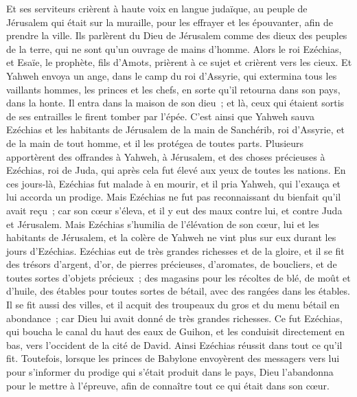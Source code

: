 \begin{multicols}{2}
Et ses serviteurs crièrent à haute voix en langue judaïque, au peuple de Jérusalem qui était sur la muraille, pour les effrayer et les épouvanter, afin de prendre la ville.
Ils parlèrent du Dieu de Jérusalem comme des dieux des peuples de la terre, qui ne sont qu'un ouvrage de mains d'homme.
Alors le roi Ezéchias, et Esaïe, le prophète, fils d'Amots, prièrent à ce sujet et crièrent vers les cieux.
Et Yahweh envoya un ange, dans le camp du roi d'Assyrie, qui extermina tous les vaillants hommes, les princes et les chefs, en sorte qu'il retourna dans son pays, dans la honte. Il entra dans la maison de son dieu~; et là, ceux qui étaient sortis de ses entrailles le firent tomber par l'épée.
C'est ainsi que Yahweh sauva Ezéchias et les habitants de Jérusalem de la main de Sanchérib, roi d'Assyrie, et de la main de tout homme, et il les protégea de toutes parts.
Plusieurs apportèrent des offrandes à Yahweh, à Jérusalem, et des choses précieuses à Ezéchias, roi de Juda, qui après cela fut élevé aux yeux de toutes les nations.
En ces jours-là, Ezéchias fut malade à en mourir, et il pria Yahweh, qui l'exauça et lui accorda un prodige.
Mais Ezéchias ne fut pas reconnaissant du bienfait qu'il avait reçu~; car son cœur s'éleva, et il y eut des maux contre lui, et contre Juda et Jérusalem.
Mais Ezéchias s'humilia de l'élévation de son cœur, lui et les habitants de Jérusalem, et la colère de Yahweh ne vint plus sur eux durant les jours d'Ezéchias.
Ezéchias eut de très grandes richesses et de la gloire, et il se fit des trésors d'argent, d'or, de pierres précieuses, d'aromates, de boucliers, et de toutes sortes d'objets précieux~;
des magasins pour les récoltes de blé, de moût et d'huile, des étables pour toutes sortes de bétail, avec des rangées dans les étables.
Il se fit aussi des villes, et il acquit des troupeaux du gros et du menu bétail en abondance~; car Dieu lui avait donné de très grandes richesses.
Ce fut Ezéchias, qui boucha le canal du haut des eaux de Guihon, et les conduisit directement en bas, vers l'occident de la cité de David. Ainsi Ezéchias réussit dans tout ce qu'il fit.
Toutefois, lorsque les princes de Babylone envoyèrent des messagers vers lui pour s'informer du prodige qui s'était produit dans le pays, Dieu l'abandonna pour le mettre à l'épreuve, afin de connaître tout ce qui était dans son cœur.

\end{multicols}
